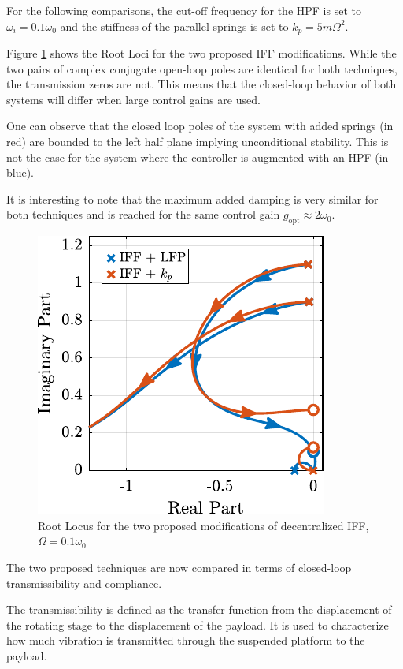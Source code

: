 \documentclass[10pt]{iopart}
\begin{document}
For the following comparisons, the cut-off frequency for the HPF is set to \(\omega_i = 0.1 \omega_0\) and the stiffness of the parallel springs is set to \(k_p = 5 m \Omega^2\).

\par
Figure \ref{fig:comp_root_locus} shows the Root Loci for the two proposed IFF modifications.
While the two pairs of complex conjugate open-loop poles are identical for both techniques, the transmission zeros are not.
This means that the closed-loop behavior of both systems will differ when large control gains are used.

One can observe that the closed loop poles of the system with added springs (in red) are bounded to the left half plane implying unconditional stability.
This is not the case for the system where the controller is augmented with an HPF (in blue).

It is interesting to note that the maximum added damping is very similar for both techniques and is reached for the same control gain \(g_\text{opt} \approx 2 \omega_0\).

\begin{figure}[htbp]
\centering
\includegraphics[scale=1]{figs/fig18.pdf}
\caption{\label{fig:comp_root_locus}Root Locus for the two proposed modifications of decentralized IFF, \(\Omega = 0.1 \omega_0\)}
\end{figure}

\par
The two proposed techniques are now compared in terms of closed-loop transmissibility and compliance.

The transmissibility is defined as the transfer function from the displacement of the rotating stage to the displacement of the payload.
It is used to characterize how much vibration is transmitted through the suspended platform to the payload.
\end{document}
